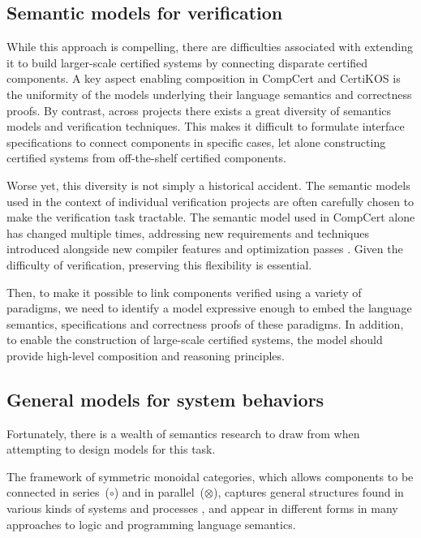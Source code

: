 \documentclass[format=sigplan,authordraft]{acmart}
\begin{document}

\subsection{Semantic models for verification} %

While this approach is compelling,
there are difficulties associated with extending it
to build larger-scale certified systems
by connecting disparate certified components.
A key aspect enabling composition in CompCert and CertiKOS
is the uniformity of the models underlying
their language semantics and correctness proofs.
By contrast,
across projects
there exists a great diversity
of semantics models and verification techniques.
This makes it difficult to formulate
interface specifications to connect components
in specific cases,
let alone constructing certified systems
from off-the-shelf certified components.

Worse yet,
this diversity is not simply a historical accident.
The semantic models
used in the context of individual verification projects
are often carefully chosen
to make the verification task tractable.
The semantic model used in CompCert alone
has changed multiple times,
addressing new requirements and techniques introduced alongside
new compiler features and optimization passes \cite{compsem}.
Given the difficulty of verification,
preserving this flexibility is essential.

Then,
to make it possible to link components
verified using a variety of paradigms,
we need to identify a model
expressive enough to embed
the language semantics, specifications and correctness proofs
of these paradigms.
In addition,
to enable the construction of large-scale certified systems,
the model should provide
high-level composition and reasoning principles.


\subsection{General models for system behaviors} %

Fortunately,
there is a wealth of semantics research to draw from
when attempting to design models for this task.

The framework of
symmetric monoidal categories,
which allows components to be
connected in series~($\circ$) and in parallel~($\otimes$),
captures general structures found
in various kinds of systems and processes \cite{rosetta},
and appear in different forms
in many approaches to logic and programming language semantics.
\end{document}
